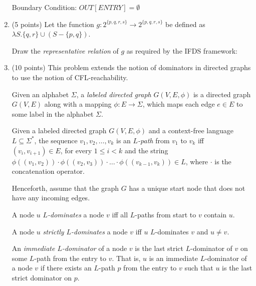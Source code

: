 \documentclass[12pt]{article}
\begin{document}
\begin{enumerate}
\begin{mdframed}
\begin{itemize}
        \end{itemize}
    
        Boundary Condition: $OUT[ENTRY] = \emptyset$

      \end{mdframed}

      \item (5 points) Let the function $g: 2^{\{p,q,r, s\}} \rightarrow 2^{\{p,q,r,s\}}$ be defined 
      as $\lambda S. \{q, r\} \cup (S - \{p, q \})$. 
    
      Draw the \emph{representative relation} of $g$ as required by the IFDS framework:
    
      \begin{mdframed}
        \vspace{5em}
        
      \end{mdframed}

      \clearpage
      \item (10 points) This problem extends the notion of dominators in
      directed graphs to use the notion of CFL-reachability.

      Given an alphabet $\Sigma$, a \emph{labeled directed graph} $G(V, E, \phi)$ is a
      directed graph $G(V, E)$  along with a mapping $\phi \colon E \to \Sigma$,
      which maps each edge $e\in E$ to some label in the alphabet $\Sigma$. 

      Given a labeled directed graph $G(V, E, \phi)$ and a context-free language
      $L \subseteq \Sigma^*$, the sequence $v_1, v_2, \ldots, v_k$ is an
      \emph{$L$-path} from $v_1$ to $v_k$ iff $(v_i,v_{i+1}) \in E$, for every
      $1\leq i < k$ and the string $\phi((v_1, v_2)) \cdot \phi((v_2, v_3)) \cdot \ldots \cdot
      \phi((v_{k-1},v_k)) \in L$, where $\cdot$ is the concatenation operator. 

      Henceforth, assume that the graph $G$ has a unique start node that does
      not have any incoming edges. 

      A node $u$ \emph{$L$-dominates} a node $v$ iff all $L$-paths from start to 
      $v$ contain $u$. 

      A node $u$ \emph{strictly $L$-dominates} a node $v$ iff $u$ $L$-dominates $v$ 
      and $u \neq v$. 

      An \emph{immediate $L$-dominator} of a node $v$ is the last strict
      $L$-dominator of $v$ on some $L$-path from the entry to $v$. That is, $u$
      is an immediate $L$-dominator of a node $v$ if there exists an $L$-path
      $p$ from the entry to $v$ such that $u$ is the last strict dominator on
      $p$.


\end{enumerate}
\end{document}
